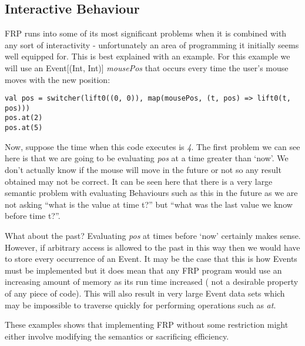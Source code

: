       
    \subsection{Interactive Behaviour}
      FRP runs into some of its most significant problems when it is combined with any
      sort of interactivity - unfortunately an area of programming it initially seems
      well equipped for. This is best explained with an example. For this example we will use an 
      Event[(Int, Int)] \emph{mousePos} that occurs every time the user's mouse moves with the new position:

\begin{verbatim}
val pos = switcher(lift0((0, 0)), map(mousePos, (t, pos) => lift0(t, pos)))
pos.at(2)
pos.at(5)
\end{verbatim}    

      Now, suppose the time when this code executes is \emph{4}. The first problem we can see here
      is that we are going to be evaluating \emph{pos} at a time greater than `now'. We don't
      actually know if the mouse will move in the future or not so any result obtained may not
      be correct. It can be seen here that there is a very large semantic problem with evaluating
      Behaviours such as this in the future as we are not asking ``what is the value at time t?''
      but ``what was the last value we know before time t?''. 
      
      What about the past? Evaluating \emph{pos} at times before `now' certainly makes sense. However, if arbitrary
      access is allowed to the past in this way then we would have to store every occurrence
      of an Event. It may be the case that this is how Events must be implemented but it does
      mean that any FRP program would use an increasing amount of memory as its run time increased (
      not a desirable property of any piece of code). This will also result in very large Event data sets which
      may be impossible to traverse quickly for performing operations such as \emph{at}.
      
      These examples shows that implementing FRP without some restriction might either involve modifying the
      semantics or sacrificing efficiency.
